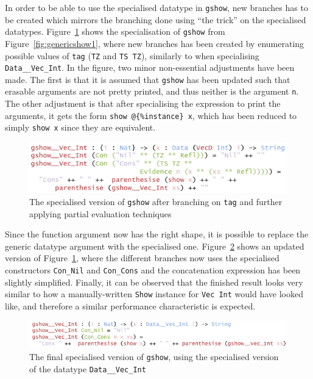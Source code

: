 \documentclass{ituthesis}
\newcommand{\ttconstructor}[1]{\textcolor{constructor-color}{\texttt{#1}}}
\newcommand{\tttype}[1]{\textcolor{type-color}{\texttt{#1}}}
\newcommand{\ttdec}[1]{\textcolor{declared-var-color}{\texttt{#1}}}
\newcommand{\ttvar}[1]{\textcolor{local-var-color}{\texttt{#1}}}
\newcommand{\ttliteral}[1]{\textcolor{literal-color}{\texttt{#1}}}
\theoremstyle{break}
\begin{document}
In order to be able to use the specialised datatype in \ttdec{gshow}, new branches has to be created which mirrors the branching done using ``the trick'' on the specialised datatypes.
Figure~\ref{fig:genericshow2} shows the specialisation of \ttdec{gshow} from Figure~\ref{fig:genericshow1}, where new branches has been created by enumerating possible values of \ttvar{tag} (\ttconstructor{TZ} and \ttconstructor{TS TZ}), similarly to when specialising \tttype{Data\_\_Vec\_Int}.
In the figure, two minor non-essential adjustments have been made.
The first is that it is assumed that \ttdec{gshow} has been updated such that erasable arguments are not pretty printed, and thus neither is the argument \ttvar{n}.
The other adjustment is that after specialising the expression to print the arguments, it gets the form \ttdec{show}~\texttt{@\{}\ttliteral{\%instance}\texttt{\}}~\ttvar{x}, which has been reduced to simply \ttdec{show}~\ttvar{x} since they are equivalent.

\begin{figure}[ht]
\begin{center}
    \includegraphics[scale=0.5]{Figures/PEGenericShow2.png}
\end{center}
\caption{The specialised version of \ttdec{gshow} after branching on \ttvar{tag} and further applying partial evaluation techniques}
\label{fig:genericshow2}
\end{figure}

Since the function argument now has the right shape, it is possible to replace the generic datatype argument with the specialised one.
Figure~\ref{fig:genericshow3} shows an updated version of Figure~\ref{fig:genericshow2}, where the different branches now uses the specialised constructors \ttconstructor{Con\_Nil} and \ttconstructor{Con\_Cons} and the concatenation expression has been slightly simplified.
Finally, it can be observed that the finished result looks very similar to how a manually-written \tttype{Show} instance for \tttype{Vec}~\tttype{Int} would have looked like, and therefore a similar performance characteristic is expected.

\begin{figure}[ht]
\begin{center}
    \includegraphics[scale=0.5]{Figures/PEGenericShow3.png}
\end{center}
\caption{The final specialised version of \ttdec{gshow}, using the specialised version of the datatype \tttype{Data\_\_Vec\_Int}}
\label{fig:genericshow3}
\end{figure}
\end{document}
